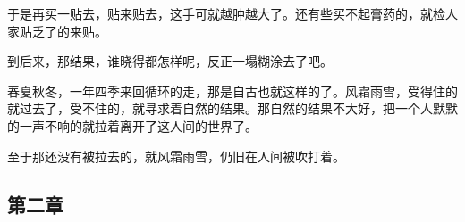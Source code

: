\par 于是再买一贴去，贴来贴去，这手可就越肿越大了。还有些买不起膏药的，就检人家贴乏了的来贴。
\par 到后来，那结果，谁晓得都怎样呢，反正一塌糊涂去了吧。
\par 春夏秋冬，一年四季来回循环的走，那是自古也就这样的了。风霜雨雪，受得住的就过去了，受不住的，就寻求着自然的结果。那自然的结果不大好，把一个人默默的一声不响的就拉着离开了这人间的世界了。
\par 至于那还没有被拉去的，就风霜雨雪，仍旧在人间被吹打着。




\subsection{第二章}

